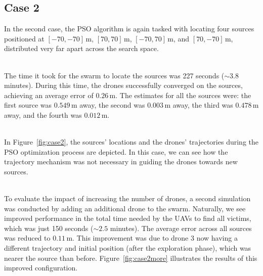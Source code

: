 \subsection{Case 2}
In the second case, the PSO algorithm is again tasked with locating four 
sources positioned at \([-70, -70] \, \text{m}\), \([70, 70] \, \text{m}\), \([-70, 70] \, \text{m}\), and \([70, -70] \, \text{m}\), 
distributed very far apart across the search space.

\noindent\\
The time it took for the swarm to locate the sources was 227 seconds (\(\sim 3.8\) minutes). 
During this time, 
the drones successfully converged on the sources, achieving an average error of \(0.26 \, \text{m}\). 
The estimates for all the sources were: the first source was \(0.549 \, \text{m}\) away, 
the second was \(0.003 \, \text{m}\) away, the third was \(0.478 \, \text{m}\) away, 
and the fourth was \(0.012 \, \text{m}\). 

\noindent\\
In Figure~\ref{fig:case2}, the sources' locations and the drones' 
trajectories during the PSO optimization process are depicted. 
In this case, we can see how the trajectory mechanism was not 
necessary in guiding the drones towards new sources.

\noindent\\
To evaluate the impact of increasing the number of drones, a second simulation 
was conducted by adding an additional drone to the swarm. 
Naturally, we see improved performance in the total time
needed by the UAVs to find all victims, which was just 150 seconds (\(\sim 2.5\) minutes).
The average error across all sources was reduced to \(0.11 \, \text{m}\).
This improvement was due to drone 3 now 
having a different trajectory and initial position (after the exploration phase), 
which was 
nearer the source than before.
Figure~\ref{fig:case2more} illustrates the results of this improved configuration. 


